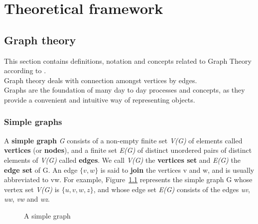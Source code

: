 \chapter{Theoretical framework}
\label{sec:theoretical_framework}

\section{Graph theory}
This section contains definitions, notation and concepts related to Graph Theory according
to \cite{graph_theory:2010}. \\
Graph theory deals with connection amongst vertices by edges. \\
Graphs are the foundation of many day to day processes and concepts, as they provide a convenient
and intuitive way of representing objects.

\subsection{Simple graphs}
A \textbf{simple graph} \textit{G} consists of a non-empty finite set \textit{V(G)} of elements called \textbf{vertices}
(or \textbf{nodes}), and a finite set \textit{E(G)} of distinct unordered pairs of distinct elements of \textit{V(G)}
called \textbf{edges}. We call \textit{V(G)} the \textbf{vertices set} and \textit{E(G)} the \textbf{edge set} of G.
An edge $\{\textit{v}, \textit{w}\}$ is said to \textbf{join} the vertices v and w, and is usually abbreviated to vw. For example, Figure~\ref{fig:simple_graph} represents the simple graph G whose vertex set \textit{V(G)} is $\{\textit{u}, \textit{v}, \textit{w}, \textit{z}\}$, and whose
edge set \textit{E(G)} consists of the edges \textit{uv}, \textit{uw}, \textit{vw} and \textit{wz}. 

\begin{figure}[H]
    \centering
    \caption{A simple graph}
    \label{fig:simple_graph}
\end{figure}

